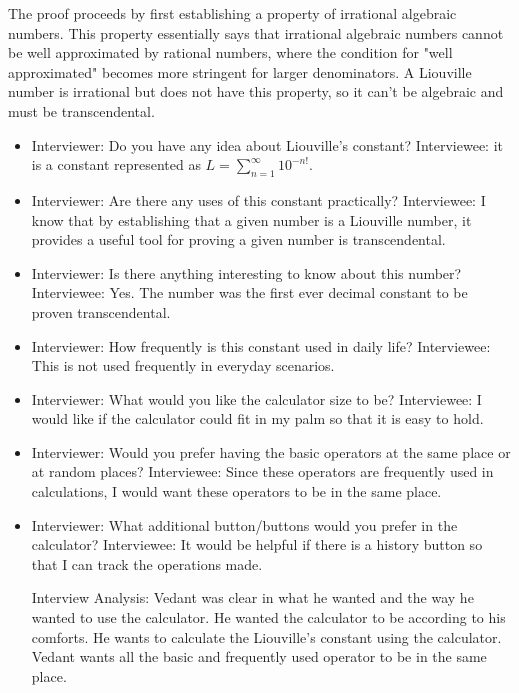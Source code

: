 \documentclass[12pt]{article}
\begin{document}
The proof proceeds by first establishing a property of irrational algebraic numbers. This property essentially says that irrational algebraic numbers cannot be well approximated by rational numbers, where the condition for "well approximated" becomes more stringent for larger denominators. A Liouville number is irrational but does not have this property, so it can't be algebraic and must be transcendental.
\newpage
\maketitle
\begin{itemize}
\item
Interviewer: Do you have any idea about Liouville’s constant?\newline
Interviewee: it is a constant represented as 
$L=\sum_{n=1}^{\infty} 10^{-n!}$.\newline
\item
Interviewer: Are there any uses of this constant practically?\newline
Interviewee: I know that by establishing that a given number is a Liouville number, it provides a useful tool for proving a given number is transcendental. \newline
\item
Interviewer: Is there anything interesting to know about this number?\newline
Interviewee: Yes. The number was the first ever decimal constant to be proven transcendental.\newline
\item
Interviewer: How frequently is this constant used in daily life? \newline
Interviewee: This is not used frequently in everyday scenarios.\newline
\item
Interviewer: What would you like the calculator size to be?\newline
Interviewee: I would like if the calculator could fit in my palm so that it is easy to hold.\newline
\item
Interviewer: Would you prefer having the basic operators at the same place or at random places?\newline
Interviewee: Since these operators are frequently used in calculations, I would want these operators to be in the same place. \newline
\item
 Interviewer: What additional button/buttons would you prefer in the calculator?\newline
 Interviewee: It would be helpful if there is a history button so that I can track the operations made.\newline
 
 Interview Analysis: Vedant was clear in what he wanted and the way he wanted to use the calculator. He wanted the calculator to be according to his comforts. He wants to calculate the Liouville's constant using the calculator. Vedant wants all the basic and frequently used operator to be in the same place. 


\end{itemize}
\end{document}
